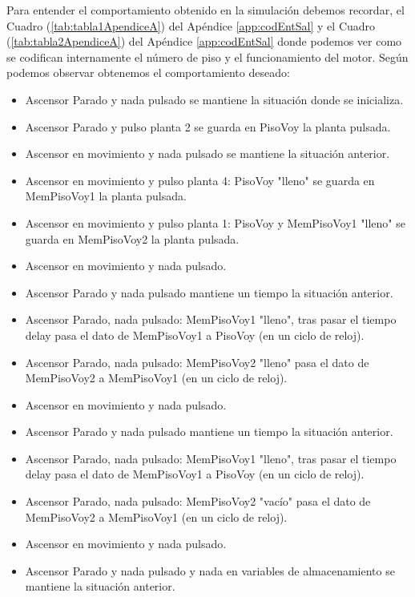     Para entender el comportamiento obtenido en la simulación debemos recordar, el Cuadro (\ref{tab:tabla1ApendiceA}) del Apéndice \ref{app:codEntSal} y el Cuadro (\ref{tab:tabla2ApendiceA}) del Apéndice \ref{app:codEntSal} donde podemos ver como se codifican internamente el número de piso y el funcionamiento del motor. 
	Según podemos observar obtenemos el comportamiento deseado:
	\begin{itemize}
	    \item Ascensor Parado y nada pulsado se mantiene la situación donde se inicializa.
	    \item Ascensor Parado y pulso planta 2 se guarda en PisoVoy la planta pulsada.
	    \item Ascensor en movimiento y nada pulsado se mantiene la situación anterior.
	    \item Ascensor en movimiento y pulso planta 4: PisoVoy "lleno" se guarda en MemPisoVoy1 la planta pulsada.
	    \item Ascensor en movimiento y pulso planta 1: PisoVoy y MemPisoVoy1 "lleno" se guarda en MemPisoVoy2 la planta pulsada.
	    \item Ascensor en movimiento y nada pulsado.
	    \item Ascensor Parado y nada pulsado mantiene un tiempo la situación anterior.
	    \item Ascensor Parado, nada pulsado: MemPisoVoy1 "lleno", tras pasar el tiempo delay pasa el dato de MemPisoVoy1 a PisoVoy (en un ciclo de reloj). 
	    \item Ascensor Parado, nada pulsado: MemPisoVoy2 "lleno" pasa el dato de MemPisoVoy2 a MemPisoVoy1 (en un ciclo de reloj).
	    \item Ascensor en movimiento y nada pulsado.				 
	    \item Ascensor Parado y nada pulsado mantiene un tiempo la situación anterior.
	    \item Ascensor Parado, nada pulsado: MemPisoVoy1 "lleno", tras pasar el tiempo delay pasa el dato de MemPisoVoy1 a PisoVoy (en un ciclo de reloj). 
	    \item Ascensor Parado, nada pulsado: MemPisoVoy2 "vacío" pasa el dato de MemPisoVoy2 a MemPisoVoy1 (en un ciclo de reloj).
	    \item Ascensor en movimiento y nada pulsado.
	    \item Ascensor Parado y nada pulsado y nada en variables de almacenamiento se mantiene la situación anterior.
	\end{itemize}

